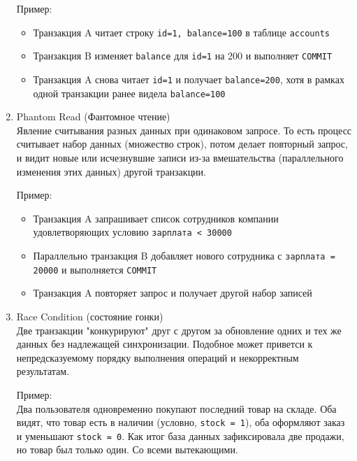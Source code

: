 \begin{enumerate}
    Пример:
    \begin{itemize}
        \item Транзакция A читает строку \texttt{id=1, balance=100} в таблице \texttt{accounts}
        \item Транзакция B изменяет \texttt{balance} для \texttt{id=1} на 200 и выполняет \texttt{COMMIT}
        \item Транзакция A снова читает \texttt{id=1} и получает \texttt{balance=200}, хотя в рамках одной транзакции ранее видела \texttt{balance=100}
    \end{itemize}

    \item Phantom Read (Фантомное чтение) ~\\ 
    Явление считывания разных данных при одинаковом запросе. То есть процесс считывает набор данных (множество строк), потом делает повторный запрос, и видит новые или исчезнувшие записи из-за вмешательства (параллельного изменения этих данных) другой транзакции.

    Пример:
    \begin{itemize}
        \item Транзакция A запрашивает список сотрудников компании удовлетворяющих условию \texttt{зарплата < 30000}
        \item Параллельно транзакция B добавляет нового сотрудника с \texttt{зарплата = 20000} и выполняется \texttt{COMMIT}
        \item Транзакция A повторяет запрос и получает другой набор записей
    \end{itemize}

    \item Race Condition (состояние гонки) ~\\
    Две транзакции "конкурируют" друг с другом за обновление одних и тех же данных без надлежащей синхронизации. Подобное может приветси к непредсказуемому порядку выполнения операций и некорректным результатам.

    Пример: ~\\
    Два пользователя одновременно покупают последний товар на складе. Оба видят, что товар есть в наличии (условно, \texttt{stock = 1}), оба оформляют заказ и уменьшают \texttt{stock = 0}. Как итог база данных зафиксировала две продажи, но товар был только один. Со всеми вытекающими.

\end{enumerate}

